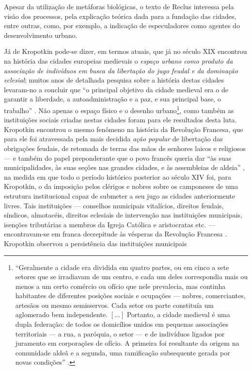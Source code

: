 \begin{citacao}
Apesar da utilização de metáforas biológicas, o texto de Reclus interessa pela visão dos processos, pela explicação teórica dada para a fundação das cidades, entre outras, como, por exemplo, a indicação de especuladores como agentes do desenvolvimento urbano. \cite[p.~65]{vasconcelos_dois_2012}
\end{citacao}

Já de Kropotkin pode-se dizer, em termos atuais, que já no século XIX encontrou na história das cidades europeias medievais o \textit{espaço urbano como produto da associação de indivíduos em busca da libertação do jugo feudal e da dominação eclesial}; muitos anos de detalhada pesquisa sobre a história destas cidades levaram-no a concluir que ``o principal objetivo da cidade medieval era o de garantir a liberdade, a autoadministração e a paz, e sua principal base, o trabalho'' \cite[p.~142]{KROPOTKIN2009}. Não apenas o espaço físico e o desenho urbano\footnote{``Geralmente a cidade era dividida em quatro partes, ou em cinco a sete setores que se irradiavam de um centro, e cada um deles correspondia  mais ou menos a um certo comércio ou ofício que nele prevalecia, mas continha habitantes de diferentes posições sociais e ocupações --- nobres, comerciantes, artesãos ou mesmo semisservos. Cada setor ou parte constituía um aglomerado bem independente. \([\dots]\) Portanto, a cidade medieval é uma dupla federação: de todos os domicílios unidos em pequenas associações territoriais --- a rua, a paróquia, o setor --- e de indivíduos ligados por juramento em corporações de ofício. A primeira foi resultante da origem na comunidade aldeã e a segunda, uma ramificação subsequente gerada por novas condições'' \cite[p.~142]{KROPOTKIN2009}.}, como também as instituições sociais criadas nestas cidades foram para ele resultados desta luta. Kropotkin encontrou o mesmo fenômeno na história da Revolução Francesa, que para ele foi atravessada pela mais decidida \textit{ação popular} de libertação das obrigações feudais, de retomada de terras das mãos de senhores laicos e religiosos --- e também do papel preponderante que o povo francês queria dar ``às suas municipalidades, às suas seções nas grandes cidades, e às assembleias de aldeia'' \cite[p.~23]{KROPOTKIN1955}, na medida em que todo o período histórico posterior ao século XIV foi, para Kropotkin, o da imposição pelos clérigos e nobres sobre os camponeses de uma estrutura institucional capaz de submeter a seu jugo as cidades anteriormente livres. Tais instituições --- conselhos municipais vitalícios, direitos feudais, síndicos, almotacéis, direitos eclesiais de intervenção nas instituições municipais, isenções tributárias a membros da Igreja Católica e aristocratas etc. --- encontravam-se em franca decrepitude às vésperas da Revolução Francesa \cite[pp.~118-120]{KROPOTKIN1955}. Kropotkin observou a persistência das instituições municipais 